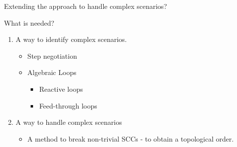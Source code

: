 \documentclass{beamer}
\begin{document}
\begin{frame}{Extending the approach to handle complex scenarios?}
    \begin{block}{What is needed?}
        \begin{enumerate}
            \item A way to identify complex scenarios.
            \begin{itemize}
                \item Step negotiation
                \item Algebraic Loops
                \begin{itemize}
                    \item Reactive loops
                    \item Feed-through loops
                \end{itemize}        
            \end{itemize}
            \item A way to handle complex scenarios
            \begin{itemize}
                \item A method to break non-trivial SCCs - to obtain a topological order.

            \end{itemize}
        \end{enumerate}
    \end{block}
\end{frame}
\end{document}
